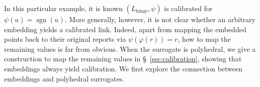 \documentclass[11pt]{article}
\newcommand{\Comments}{1}
\newcommand{\mynote}[2]{\ifnum\Comments=1\textcolor{#1}{#2}\fi}
\newcommand{\raf}[1]{\mynote{darkgreen}{[RF: #1]}}
\newcommand{\simplex}{\Delta_\Y}
\newcommand{\R}{\mathcal{R}}
\newcommand{\Y}{\mathcal{Y}}
\newcommand{\inprod}[2]{\langle #1, #2 \rangle}%
\newcommand{\hinge}{L_{\mathrm{hinge}}}
\newcommand{\ellzo}{\ell_{\text{0-1}}}
\DeclareMathOperator*{\argmax}{arg\,max}
\DeclareMathOperator*{\sgn}{sgn}
\begin{document}
In this particular example, it is known $(\hinge,\psi)$ is calibrated for $\psi(u) = \sgn(u)$.
More generally, however, it is not clear whether an arbitrary embedding yields a calibrated link.
Indeed, apart from mapping the embedded points back to their original reports via $\psi(\varphi(r)) = r$, how to map the remaining values is far from obvious.
When the surrogate is polyhedral, we give a construction to map the remaining values in \S~\ref{sec:calibration}, showing that embeddings always yield calibration.
We first explore the connection between embeddings and polyhedral surrogates.








\end{document}
